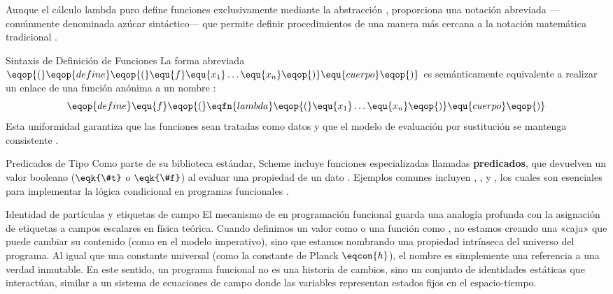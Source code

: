 Aunque el cálculo lambda puro define funciones exclusivamente mediante la abstracción ,  proporciona una notación abreviada —comúnmente denominada azúcar sintáctico— que permite definir procedimientos de una manera más cercana a la notación matemática tradicional \cite{SICP}.

\begin{definicion}{Sintaxis de Definición de Funciones}
La forma abreviada $\eqop{(}\eqop{define} \eqop{(}\equ{f} \equ{x_1} \dots \equ{x_n}\eqop{)} \equ{cuerpo}\eqop{)}$ es semánticamente equivalente a realizar un enlace de una función anónima a un nombre \cite{SICP}:
\begin{equation}
\eqop{define} \equ{f} \eqop{(}\eqfn{lambda} \eqop{(}\equ{x_1} \dots \equ{x_n}\eqop{)} \equ{cuerpo}\eqop{)}
\end{equation}
Esta uniformidad garantiza que las funciones sean tratadas como datos y que el modelo de evaluación por sustitución se mantenga consistente \cite{SICP}.
\end{definicion}

\begin{observacion}{Predicados de Tipo}
Como parte de su biblioteca estándar, Scheme incluye funciones especializadas llamadas \textbf{predicados}, que devuelven un valor booleano ($\eqk{\#t}$ o $\eqk{\#f}$) al evaluar una propiedad de un dato \cite{HtDP, SICP}. Ejemplos comunes incluyen , ,  y , los cuales son esenciales para implementar la lógica condicional en programas funcionales \cite{SICP}.
\end{observacion}

\begin{fisicaconexion}{Identidad de partículas y etiquetas de campo}
El mecanismo de  en programación funcional guarda una analogía profunda con la asignación de etiquetas a campos escalares en física teórica. Cuando definimos un valor como  o una función como , no estamos creando una «caja» que puede cambiar su contenido (como en el modelo imperativo), sino que estamos nombrando una propiedad intrínseca del universo del programa. Al igual que una constante universal (como la constante de Planck $\eqcon{h}$), el nombre es simplemente una referencia a una verdad inmutable. En este sentido, un programa funcional no es una historia de cambios, sino un conjunto de identidades estáticas que interactúan, similar a un sistema de ecuaciones de campo donde las variables representan estados fijos en el espacio-tiempo.
\end{fisicaconexion}

